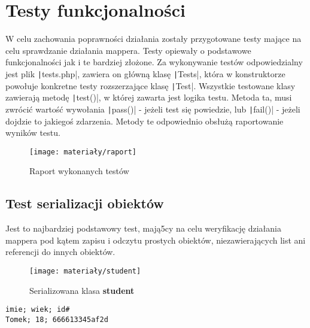 \section{Testy funkcjonalności}
W celu zachowania poprawności działania zostały przygotowane testy mające na celu sprawdzanie działania mappera. Testy opiewały o podstawowe funkcjonalności jak i te bardziej złożone. Za wykonywanie testów odpowiedzialny jest plik \texttt|tests.php|, zawiera on główną klasę \texttt|Tests|, która w konstruktorze powołuje konkretne testy rozszerzające klasę \texttt|Test|. Wszystkie testowane klasy zawierają metodę \texttt|test()|, w której zawarta jest logika testu. Metoda ta, musi zwrócić wartość wywołania  \texttt|pass()| - jeżeli test się powiedzie, lub \texttt|fail()| - jeżeli dojdzie to jakiegoś zdarzenia. Metody te odpowiednio obsłużą raportowanie wyników testu. 

\begin{figure}[ht]
	\centering
	\texttt{[image: materiały/raport]}
	\caption{Raport wykonanych testów}
\end{figure}

\subsection{Test serializacji obiektów}
Jest to najbardziej podstawowy test, mają5cy na celu weryfikację działania mappera pod kątem zapisu i odczytu prostych obiektów, niezawierających list ani referencji do innych obiektów.

\begin{figure}[ht]
	\centering
	\texttt{[image: materiały/student]}
	\caption{Serializowana klasa \textbf{student}}
\end{figure}


\begin{empty}
	\begin{verbatim}
imie; wiek; id#
Tomek; 18; 666613345af2d
	\end{verbatim}
	\vspace{-10pt}
\end{empty}


